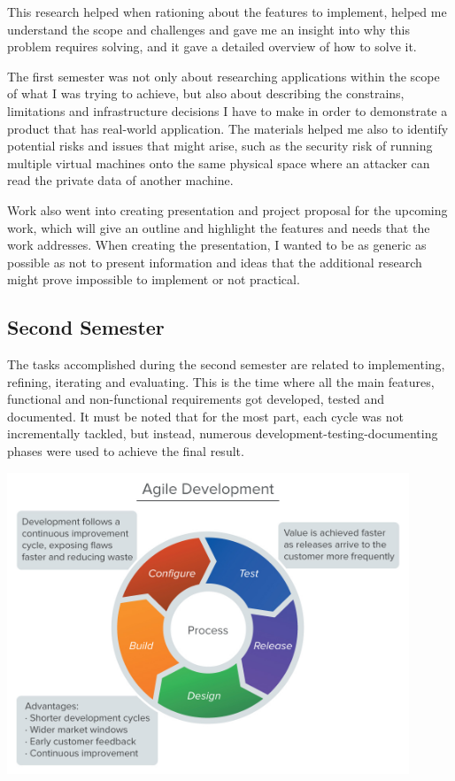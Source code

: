 \documentclass{article}
\begin{document}
This research helped when rationing about the features to implement, helped me understand the scope and challenges and gave me an insight into why this problem requires solving, and it gave a detailed overview of how to solve it.

The first semester was not only about researching applications within the scope of what I was trying to achieve, but also about describing the constrains, limitations and infrastructure decisions I have to make in order to demonstrate a  product that has real-world application.
The materials helped me also to identify potential risks and issues that might arise, such as the security risk of running multiple virtual machines onto the same physical space where an attacker can read the private data of another machine.

Work also went into creating presentation and project proposal for the upcoming work, which will give an outline and highlight the features and needs that the work addresses.
When creating the presentation, I wanted to be as generic as possible as not to present information and ideas that the additional research might prove impossible to implement or not practical.

\subsection{Second Semester}

The tasks accomplished during the second semester are related to implementing, refining, iterating and evaluating. This is the time where all the main features, functional and non-functional requirements got developed, tested and documented. It must be noted that for the most part, each cycle was not incrementally tackled, but instead, numerous development-testing-documenting phases were used to achieve the final result.
\begin{center}
	\includegraphics[width=12cm]{agile.jpg}
\end{center}
\end{document}

